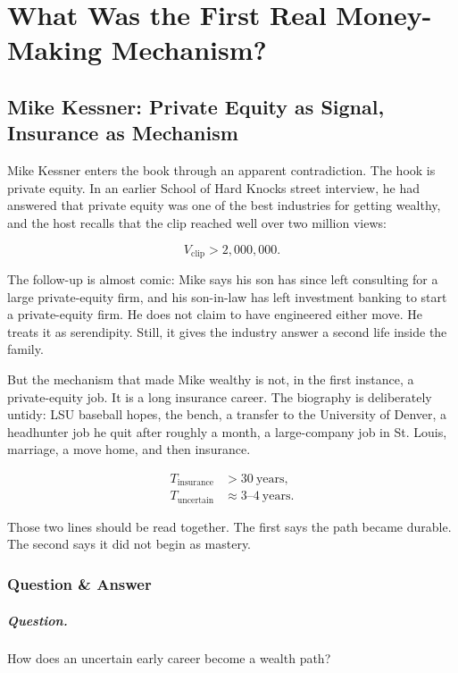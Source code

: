 \documentclass[11pt,oneside]{book}
\begin{document}
\chapter{What Was the First Real Money-Making Mechanism?}

\section{Mike Kessner: Private Equity as Signal, Insurance as Mechanism}

Mike Kessner enters the book through an apparent contradiction. The hook is private equity. In an earlier School of Hard Knocks street interview, he had answered that private equity was one of the best industries for getting wealthy, and the host recalls that the clip reached well over two million views:

\begin{equation}
V_{\mathrm{clip}}>2{,}000{,}000.
\end{equation}

The follow-up is almost comic: Mike says his son has since left consulting for a large private-equity firm, and his son-in-law has left investment banking to start a private-equity firm. He does not claim to have engineered either move. He treats it as serendipity. Still, it gives the industry answer a second life inside the family.

But the mechanism that made Mike wealthy is not, in the first instance, a private-equity job. It is a long insurance career. The biography is deliberately untidy: LSU baseball hopes, the bench, a transfer to the University of Denver, a headhunter job he quit after roughly a month, a large-company job in St. Louis, marriage, a move home, and then insurance.

\begin{align}
T_{\mathrm{insurance}} &> 30\ \mathrm{years},\\
T_{\mathrm{uncertain}} &\approx 3\text{--}4\ \mathrm{years}.
\end{align}

Those two lines should be read together. The first says the path became durable. The second says it did not begin as mastery.

\subsection{Question \& Answer}

\paragraph{Question.}
How does an uncertain early career become a wealth path?
\end{document}

